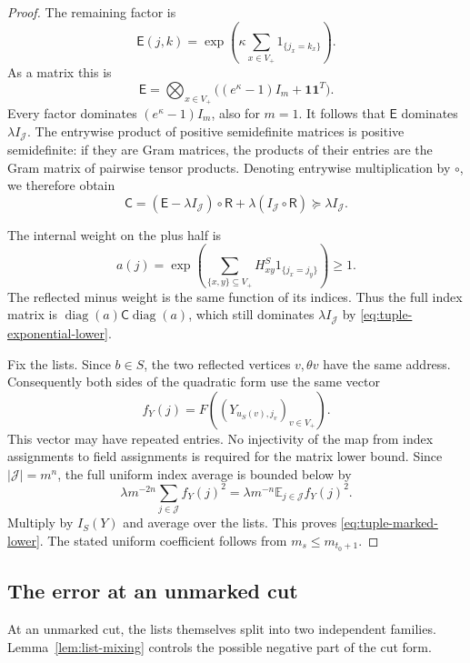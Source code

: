 \begin{proof}
The remaining factor is
\[
 \mathsf E(j,k)=
 \exp\left(\kappa\sum_{x\in V_+}1_{\{j_x=k_x\}}\right).
\]
As a matrix this is
\[
 \mathsf E=\bigotimes_{x\in V_+}
 \bigl((e^\kappa-1)I_m+\mathbf1\mathbf1^T\bigr).
\]
Every factor dominates \((e^\kappa-1)I_m\), also for \(m=1\).
It follows that \(\mathsf E\) dominates \(\lambda I_{\mathcal J}\).
The entrywise product of positive semidefinite matrices is positive
semidefinite: if they are Gram matrices, the products of their
entries are the Gram matrix of pairwise tensor products.  Denoting
entrywise multiplication by \(\circ\), we therefore obtain
\begin{equation}
 \mathsf C
 = (\mathsf E-\lambda I_{\mathcal J})\circ\mathsf R
   +\lambda(I_{\mathcal J}\circ\mathsf R)
 \succeq\lambda I_{\mathcal J}.
 \label{eq:tuple-exponential-lower}
\end{equation}

The internal weight on the plus half is
\[
 a(j)=\exp\left(\sum_{\{x,y\}\subseteq V_+}
 H^S_{xy}1_{\{j_x=j_y\}}\right)\ge1.
\]
The reflected minus weight is the same function of its indices.
Thus the full index matrix is
\(\operatorname{diag}(a)\mathsf C\operatorname{diag}(a)\),
which still dominates \(\lambda I_{\mathcal J}\) by
\eqref{eq:tuple-exponential-lower}.

Fix the lists.  Since \(b\in S\), the two reflected vertices
\(v,\theta v\) have the same address.  Consequently both sides
of the quadratic form use the same vector
\[
 f_Y(j)=F((Y_{u_S(v),j_v})_{v\in V_+}).
\]
This vector may have repeated entries.  No injectivity of the map
from index assignments to field assignments is required for the
matrix lower bound.  Since \(|\mathcal J|=m^n\), the full uniform
index average is bounded below by
\[
 \lambda m^{-2n}\sum_{j\in\mathcal J}f_Y(j)^2
 =\lambda m^{-n}\mathbb E_{j\in\mathcal J}f_Y(j)^2.
\]
Multiply by \(I_S(Y)\) and average over the lists.  This proves
\eqref{eq:tuple-marked-lower}.  The stated uniform coefficient
follows from \(m_s\le m_{t_0+1}\).
\end{proof}

\subsection{The error at an unmarked cut}

At an unmarked cut, the lists themselves split into two independent
families.  Lemma~\ref{lem:list-mixing} controls the possible negative
part of the cut form.

